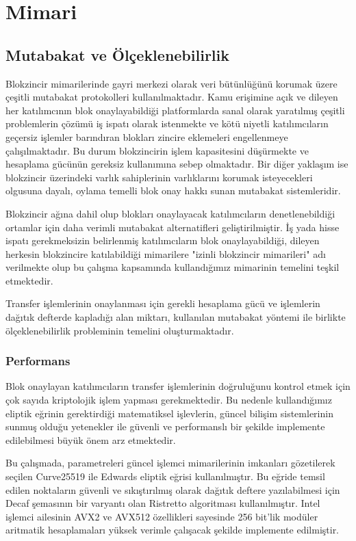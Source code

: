 \documentclass[a4paper,11pt]{article}
\begin{document}
\section{Mimari}

\subsection{Mutabakat ve Ölçeklenebilirlik}

Blokzincir mimarilerinde gayri merkezi olarak veri bütünlüğünü korumak üzere çeşitli mutabakat protokolleri kullanılmaktadır. Kamu erişimine açık ve dileyen her katılımcının blok onaylayabildiği platformlarda sanal olarak yaratılmış çeşitli problemlerin çözümü iş ispatı olarak istenmekte ve kötü niyetli katılımcıların geçersiz işlemler barındıran blokları zincire eklemeleri engellenmeye çalışılmaktadır. Bu durum blokzincirin işlem kapasitesini düşürmekte ve hesaplama gücünün gereksiz kullanımına sebep olmaktadır. Bir diğer yaklaşım ise blokzincir üzerindeki varlık sahiplerinin varlıklarını korumak isteyecekleri olgusuna dayalı, oylama temelli blok onay hakkı sunan mutabakat sistemleridir.

Blokzincir ağına dahil olup blokları onaylayacak katılımcıların denetlenebildiği ortamlar için daha verimli mutabakat alternatifleri geliştirilmiştir. İş yada hisse ispatı gerekmeksizin belirlenmiş katılımcıların blok onaylayabildiği, dileyen herkesin blokzincire katılabildiği mimarilere "izinli blokzincir mimarileri" adı verilmekte olup bu çalışma kapsamında kullandığımız mimarinin temelini teşkil etmektedir.

Transfer işlemlerinin onaylanması için gerekli hesaplama gücü ve işlemlerin dağıtık defterde kapladığı alan miktarı, kullanılan mutabakat yöntemi ile birlikte ölçeklenebilirlik probleminin temelini oluşturmaktadır.

\subsubsection{Performans}

Blok onaylayan katılımcıların transfer işlemlerinin doğruluğunu kontrol etmek için çok sayıda kriptolojik işlem yapması gerekmektedir. Bu nedenle kullandığımız eliptik eğrinin gerektirdiği matematiksel işlevlerin, güncel bilişim sistemlerinin sunmuş olduğu yetenekler ile güvenli ve performanslı bir şekilde implemente edilebilmesi büyük önem arz etmektedir.

Bu çalışmada, parametreleri güncel işlemci mimarilerinin imkanları gözetilerek seçilen Curve25519\cite{c25519} ile Edwards eliptik eğrisi kullanılmıştır. Bu eğride temsil edilen noktaların güvenli ve sıkıştırılmış olarak dağıtık deftere yazılabilmesi için Decaf\cite{decaf} şemasının bir varyantı olan Ristretto\cite{ristretto} algoritması kullanılmıştır. Intel işlemci ailesinin AVX2 ve AVX512 özellikleri sayesinde 256 bit'lik modüler aritmatik hesaplamaları yüksek verimle çalışacak şekilde implemente edilmiştir.
\end{document}
